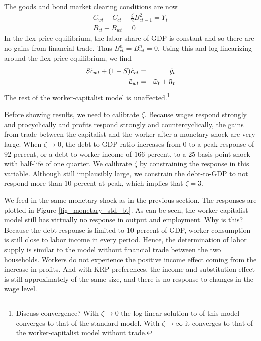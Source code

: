 The goods and bond market clearing conditions are now
\begin{eqnarray}
C_{wt}+C_{ct}+\frac{\zeta}{2}B_{ct-1}^2=Y_t  \nonumber \\
B_{ct}+B_{wt}=0 \nonumber 
\end{eqnarray}
In the flex-price equilibrium, the labor share of GDP is constant and so there are no gains from financial trade. Thus $B^n_{ct}=B^n_{wt}=0$. Using this and log-linearizing around the flex-price equilibrium, we find 
\begin{eqnarray}
\lb{bt_mcgoods_log}
\bar S \tilde c_{wt}+ (1-\bar S) \tilde c_{ct} &=& \tilde y_t  \\
\lb{bt_mcbonds_log}
\tilde c_{wt} &=& \tilde \omega_t + \tilde n_t
\end{eqnarray}
The rest of the worker-capitalist model is unaffected.\footnote{Discuss convergence? With $\zeta \rightarrow 0$ the log-linear solution to of this model converges to that of the standard model. With $\zeta \rightarrow \infty$ it converges to that of the worker-capitalist model without trade.}

Before showing results, we need to calibrate $\zeta$. Because wages respond strongly and procyclically and profits respond strongly and countercyclically, the gains from trade between the capitalist and the worker after a monetary shock are very large. When $\zeta \rightarrow 0$, the debt-to-GDP ratio increases from 0 to a peak response of $92$ percent, or a debt-to-worker income of $166$ percent, to a 25 basis point shock with half-life of one quarter. We calibrate $\zeta$ by constraining the response in this variable. Although still implausibly large, we constrain the debt-to-GDP to not respond more than $10$ percent at peak, which implies that $\zeta=3$. 

We feed in the same monetary shock as in the previous section. The responses are plotted in Figure \ref{fig_monetary_std_bt}. As can be seen, the worker-capitalist model still has virtually no response in output and employment. Why is this? Because the debt response is limited to 10 percent of GDP, worker consumption is still close to labor income in every period. Hence, the determination of labor supply is similar to the model without financial trade between the two households. Workers do not experience the positive income effect coming from the increase in profits. And with KRP-preferences, the income and substitution effect is still approximately of the same size, and there is no response to changes in the wage level. 

